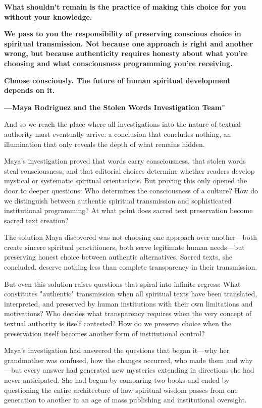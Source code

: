 \documentclass[12pt,twoside]{book}
\begin{document}
\textbf{What shouldn't remain is the practice of making this choice for you without your knowledge.}

\textbf{We pass to you the responsibility of preserving conscious choice in spiritual transmission. Not because one approach is right and another wrong, but because authenticity requires honesty about what you're choosing and what consciousness programming you're receiving.}

\textbf{Choose consciously. The future of human spiritual development depends on it.}

\textbf{—Maya Rodriguez and the Stolen Words Investigation Team"}

And so we reach the place where all investigations into the nature of textual authority must eventually arrive: a conclusion that concludes nothing, an illumination that only reveals the depth of what remains hidden.

Maya's investigation proved that words carry consciousness, that stolen words steal consciousness, and that editorial choices determine whether readers develop mystical or systematic spiritual orientations. But proving this only opened the door to deeper questions: Who determines the consciousness of a culture? How do we distinguish between authentic spiritual transmission and sophisticated institutional programming? At what point does sacred text preservation become sacred text creation?

The solution Maya discovered was not choosing one approach over another—both create sincere spiritual practitioners, both serve legitimate human needs—but preserving honest choice between authentic alternatives. Sacred texts, she concluded, deserve nothing less than complete transparency in their transmission.

But even this solution raises questions that spiral into infinite regress: What constitutes "authentic" transmission when all spiritual texts have been translated, interpreted, and preserved by human institutions with their own limitations and motivations? Who decides what transparency requires when the very concept of textual authority is itself contested? How do we preserve choice when the preservation itself becomes another form of institutional control?

Maya's investigation had answered the questions that began it—why her grandmother was confused, how the changes occurred, who made them and why—but every answer had generated new mysteries extending in directions she had never anticipated. She had begun by comparing two books and ended by questioning the entire architecture of how spiritual wisdom passes from one generation to another in an age of mass publishing and institutional oversight.
\end{document}

